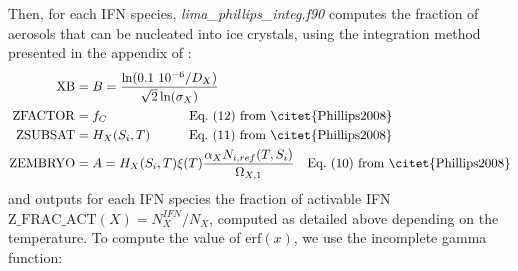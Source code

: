 Then, for each IFN species, \emph{lima\_phillips\_integ.f90} computes the fraction of aerosols that can be nucleated into ice crystals, using the integration method presented in the appendix of \citet{Vie2016}:
\begin{align}
 \mathrm{XB} &= B = \frac{\ln(0.1~10^{-6} / D_X)}{\sqrt{2} \ln(\sigma_X)} \\
 \mathrm{ZFACTOR} &= f_C \quad \quad \quad \quad \quad \quad \text{ Eq.\ (12) from \citet{Phillips2008}} \\
 \mathrm{ZSUBSAT} &= H_X(S_i,T) \quad \quad \quad \text{Eq.\ (11) from \citet{Phillips2008}} \\
 \mathrm{ZEMBRYO} &= A = H_X(S_i,T) \xi(T) \frac{\alpha_X N_{i,ref} (T,S_i)}{\Omega_{X,1}} \quad \text{Eq.\ (10) from \citet{Phillips2008}} \\
\end{align}
and outputs for each IFN species the fraction of activable IFN $\mathrm{Z\_FRAC\_ACT}(X) = N_X^{IFN} / N_X$, computed as detailed above depending on the temperature. To compute the value of $\mathrm{erf}(x)$, we use the incomplete gamma function:
